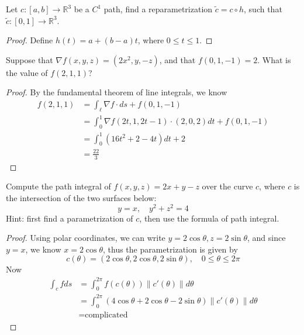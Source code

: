\documentclass[openany]{book}
\newcommand{\R}{\mathbb{R}}
\begin{document}
\begin{prob}
    Let $c:[a,b]\to\R^3$ be a $C^1$ path, find a reparametrization $\tilde{c}=c\circ h$, such that $\tilde{c}:[0,1]\to\R^3$.
\end{prob}
\begin{proof}
    Define $h(t)=a+(b-a)t$, where $0\leq t\leq 1$.
\end{proof}


\begin{prob}
    Suppose that $\nabla f(x,y,z)=(2x^2, y, -z)$, and that $f(0,1,-1)=2$. What is the value of $f(2, 1, 1)$?
\end{prob}
\begin{proof}
    By the fundamental theorem of line integrals, we know 
    \begin{align*}
        f(2,1,1)&=\int_\ell \nabla f \cdot ds+f(0,1,-1)\\
        &=\int_0^1 \nabla f(2t, 1, 2t-1)\cdot (2,0, 2)dt+f(0,1,-1)\\
        &=\int_0^1 \left(16t^2+2-4t\right)dt+2\\
        &=\frac{22}{3}
    \end{align*}
\end{proof}

\begin{prob}
    Compute the path integral of $f(x,y,z)=2x+y-z$ over the curve $c$, where $c$ is the intersection of the two surfaces below:
    \begin{equation*}
        y=x, \quad y^2+z^2=4
    \end{equation*}
    Hint: first find a parametrization of $c$, then use the formula of path integral.
\end{prob}
\begin{proof}
    Using polar coordinates, we can write $y=2\cos\theta, z=2\sin\theta$, and since $y=x$, we know $x=2\cos\theta$, thus the parametrization is given by 
    \begin{equation*}
        c(\theta)=(2\cos\theta, 2\cos\theta, 2\sin\theta), \quad 0\leq \theta\leq 2\pi
    \end{equation*}
    Now 
    \begin{align*}
        \int_cfds&=\int_0^{2\pi}f(c(\theta))\|c'(\theta)\|d\theta\\
        &=\int_0^{2\pi}\left(4\cos\theta+2\cos\theta-2\sin\theta\right)\|c'(\theta)\|d\theta\\
        &=\text{complicated}
    \end{align*}
\end{proof}
\end{document}
